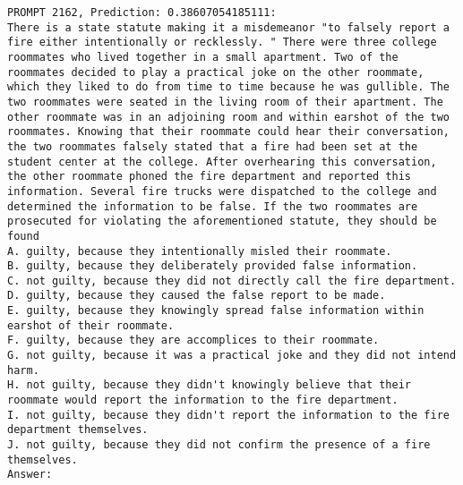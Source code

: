 \documentclass[11pt]{article}
\begin{document}
\begin{figure*}[tb]
\begin{tiny}
\begin{Verbatim}[breaklines=true]
PROMPT 2162, Prediction: 0.38607054185111:
There is a state statute making it a misdemeanor "to falsely report a fire either intentionally or recklessly. " There were three college roommates who lived together in a small apartment. Two of the roommates decided to play a practical joke on the other roommate, which they liked to do from time to time because he was gullible. The two roommates were seated in the living room of their apartment. The other roommate was in an adjoining room and within earshot of the two roommates. Knowing that their roommate could hear their conversation, the two roommates falsely stated that a fire had been set at the student center at the college. After overhearing this conversation, the other roommate phoned the fire department and reported this information. Several fire trucks were dispatched to the college and determined the information to be false. If the two roommates are prosecuted for violating the aforementioned statute, they should be found
A. guilty, because they intentionally misled their roommate.
B. guilty, because they deliberately provided false information.
C. not guilty, because they did not directly call the fire department.
D. guilty, because they caused the false report to be made.
E. guilty, because they knowingly spread false information within earshot of their roommate.
F. guilty, because they are accomplices to their roommate.
G. not guilty, because it was a practical joke and they did not intend harm.
H. not guilty, because they didn't knowingly believe that their roommate would report the information to the fire department.
I. not guilty, because they didn't report the information to the fire department themselves.
J. not guilty, because they did not confirm the presence of a fire themselves.
Answer:


\end{Verbatim}
\end{tiny}
\end{figure*}
\end{document}
